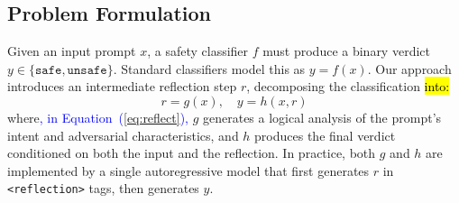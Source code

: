 \documentclass[superintelligence,article,accept,moreauthors]{Definitions/mdpi}
\newcommand{\authchg}[1]{\textcolor{blue}{#1}}
\begin{document}
\subsection{Problem Formulation}

Given an input prompt $x$, a safety classifier $f$ must produce a binary verdict \mbox{$y \in \{\texttt{safe}, \texttt{unsafe}\}$.} Standard classifiers model this as $y = f(x)$. Our approach introduces an intermediate reflection step $r$, decomposing the classification \hl{into:} %
\begin{equation}
  r = g(x), \quad y = h(x, r)\label{eq:reflect}
\end{equation}
where\authchg{, in Equation~(\ref{eq:reflect}),} $g$ generates a logical analysis of the prompt's intent and adversarial characteristics, and $h$ produces the final verdict conditioned on both the input and the reflection. In practice, both $g$ and $h$ are implemented by a single autoregressive model that first generates $r$ in \texttt{<reflection>} tags, then generates $y$.
\end{document}
